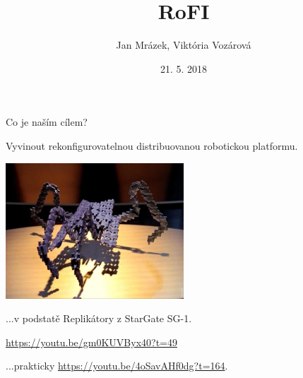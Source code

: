 \documentclass{beamer}
\title[RoFI]{RoFI}
\author{Jan Mrázek, Viktória Vozárová}
\institute{ParaDiSe}
\date{21. 5. 2018}
\begin{document}
\begin{frame}
  \titlepage
\end{frame}

\begin{frame}{Co je naším cílem?}

    Vyvinout rekonfigurovatelnou distribuovanou robotickou platformu.

    \pause

    \begin{center}
    \includegraphics[width=0.5\textwidth]{img/replicator2}

    ...v podstatě Replikátory z StarGate SG-1.

    \url{https://youtu.be/gm0KUVByx40?t=49}

    \pause

    ...prakticky \url{https://youtu.be/4oSavAHf0dg?t=164}.

    \end{center}

\end{frame}
\end{document}

